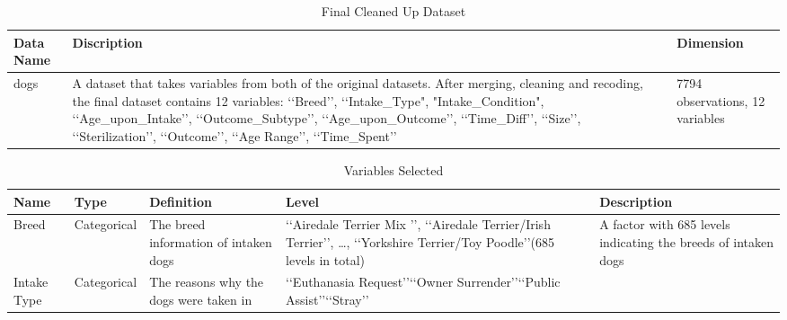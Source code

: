 \documentclass[12pt]{article}
\begin{document}
\begin{flushleft}
\begin{center}
  \begin{table}[H]
    \centering
    \caption{Final Cleaned Up Dataset}
    \small
    \begin{tabular}{p{2cm}p{6.5cm}p{2cm}}
      \toprule
      Data Name   &  Discription & Dimension \\\midrule
 dogs & A dataset that takes variables from both of the original datasets. After merging, cleaning and recoding, the final dataset contains 12 variables: \lq\lq Breed\rq\rq, \lq\lq Intake\_Type", "Intake\_Condition", \lq\lq Age\_upon\_Intake\rq\rq, \lq\lq Outcome\_Subtype\rq\rq, \lq\lq Age\_upon\_Outcome\rq\rq, \lq\lq Time\_Diff\rq\rq, \lq\lq Size\rq\rq, \lq\lq Sterilization\rq\rq, \lq\lq Outcome\rq\rq, \lq \lq Age Range\rq\rq, \lq\lq Time\_Spent\rq\rq  & 7794 observations, 12 variables\\
      \bottomrule
    \end{tabular}
  \end{table}
\end{center}

\begin{center}
  \begin{table}[H]
    \centering
    \caption{Variables Selected}
    \small
    \begin{tabular}{p{2cm}p{2cm}p{3cm}p{6cm}p{3cm}}
     \toprule
 Name   &  Type & Definition  & Level & Description\\\midrule
 Breed & Categorical & The breed information of intaken dogs & \lq\lq Airedale Terrier Mix \rq\rq, \lq\lq Airedale Terrier/Irish Terrier\rq\rq, …, \lq\lq Yorkshire Terrier/Toy Poodle\rq\rq (685 levels in total) & A factor with 685 levels indicating the breeds of intaken dogs\\ \midrule
Intake Type & Categorical &The reasons why the dogs were taken in & \lq\lq Euthanasia Request\rq\rq \lq\lq Owner Surrender\rq\rq   \lq\lq Public Assist\rq\rq   \lq\lq Stray\rq\rq   \\
      \bottomrule
    \end{tabular}
  \end{table}
\end{center}


\end{flushleft}
\end{document}
